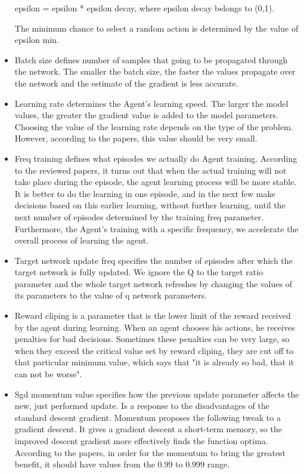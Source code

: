 \documentclass{article}
\begin{document}
\begin{itemize}
epsilon = epsilon * epsilon decay, where epsilon decay belongs to (0,1).

The minimum chance to select a random action is determined by the value of epsilon min.

\item Batch size defines number of samples that going to be propagated through the network.
The smaller the batch size, the faster the values propagate over the network and the estimate of the gradient is less accurate.

\item Learning rate determines the Agent's learning speed. 
The larger the model values, the greater the gradient value is added to the model parameters. 
Choosing the value of the learning rate depends on the type of the problem. 
However, according to the papers, this value should be very small.

\item Freq training defines what episodes we actually do Agent training.
According to the reviewed papers, it turns out that when the actual training will not take place during the episode, 
the agent learning process will be more stable. It is better to do the learning in one episode, and in the next few make decisions based on this earlier learning, without further learning, until the next number of episodes determined by the training freq parameter. Furthermore, the Agent's training with a specific frequency, we accelerate the overall process of learning the agent.

\item Target network update freq specifies the number of episodes after which the target network is fully updated.
We ignore the Q to the target ratio parameter and the whole target network refreshes by changing the values of its parameters to the value of q network parameters.

\item Reward cliping is a parameter that is the lower limit of the reward received by the agent during learning. When an agent chooses his actions,
he receives penalties for bad decisions. Sometimes these penalties can be very large, so when they exceed the critical value set by reward cliping, they are cut off to that particular minimum value, which says that "it is already so bad, that it can not be worse".

\item Sgd momentum value specifies how the previous update parameter affects the new, just performed update.
Is a response to the disadvantages of the standard descent gradient. Momentum proposes the following tweak to a gradient descent.
It gives a gradient descent a short-term memory, so the improved descent gradient more effectively finds the function optima. 
According to the papers, in order for the momentum to bring the greatest benefit, it should have values from the 0.99 to 0.999 range.


\end{itemize}
\end{document}
